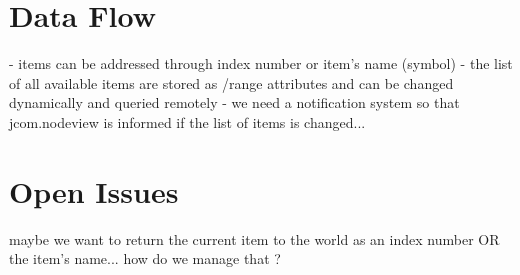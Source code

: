 \documentclass[]{article}
\begin{document}

\section{Data Flow}

- items can be addressed through index number or item's name (symbol)
- the list of all available items are stored as /range attributes and can be changed dynamically and queried remotely
- we need a notification system so that jcom.nodeview is informed if the list of items is changed... 




\section{Open Issues}

maybe we want to return the current item to the world as an index number OR the item's name... how do we manage that ?







\end{document}
